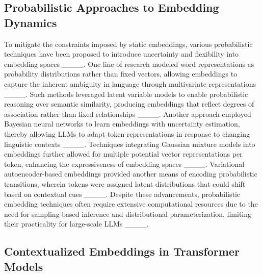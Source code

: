 \subsection{Probabilistic Approaches to Embedding Dynamics}

To mitigate the constraints imposed by static embeddings, various probabilistic techniques have been proposed to introduce uncertainty and flexibility into embedding spaces ____. One line of research modeled word representations as probability distributions rather than fixed vectors, allowing embeddings to capture the inherent ambiguity in language through multivariate representations ____. Such methods leveraged latent variable models to enable probabilistic reasoning over semantic similarity, producing embeddings that reflect degrees of association rather than fixed relationships ____. Another approach employed Bayesian neural networks to learn embeddings with uncertainty estimation, thereby allowing LLMs to adapt token representations in response to changing linguistic contexts ____. Techniques integrating Gaussian mixture models into embeddings further allowed for multiple potential vector representations per token, enhancing the expressiveness of embedding spaces ____. Variational autoencoder-based embeddings provided another means of encoding probabilistic transitions, wherein tokens were assigned latent distributions that could shift based on contextual cues ____. Despite these advancements, probabilistic embedding techniques often require extensive computational resources due to the need for sampling-based inference and distributional parameterization, limiting their practicality for large-scale LLMs ____.

\subsection{Contextualized Embeddings in Transformer Models}

